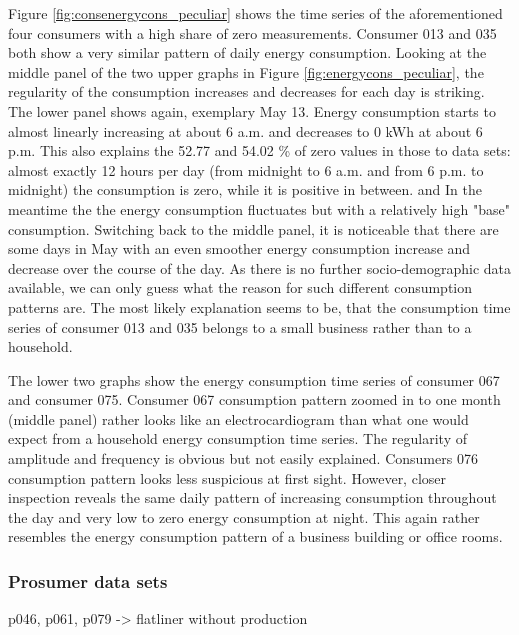 Figure \ref{fig:consenergycons_peculiar} shows the time series of the aforementioned four consumers with a high share of zero measurements. Consumer 013 and 035 both show a very similar pattern of daily energy consumption. Looking at the middle panel of the two upper graphs in Figure \ref{fig:energycons_peculiar}, the regularity of the consumption increases and decreases for each day is striking. The lower panel shows again, exemplary May 13. Energy consumption starts to almost linearly increasing at about 6 a.m. and decreases to 0 kWh at about 6 p.m. This also explains the 52.77 and 54.02 \% of zero values in those to data sets: almost exactly 12 hours per day (from midnight to 6 a.m. and from 6 p.m. to midnight) the consumption is zero, while it is positive in between. and  In the meantime the the energy consumption fluctuates but with a relatively high "base" consumption. Switching back to the middle panel, it is noticeable that there are some days in May with an even smoother energy consumption increase and decrease over the course of the day. As there is no further socio-demographic data available, we can only guess what the reason for such different consumption patterns are. The most likely explanation seems to be, that the consumption time series of consumer 013 and 035 belongs to a small business rather than to a household.

The lower two graphs show the energy consumption time series of consumer 067 and consumer 075. Consumer 067 consumption pattern zoomed in to one month (middle panel) rather looks like an electrocardiogram than what one would expect from a household energy consumption time series. The regularity of amplitude and frequency is obvious but not easily explained. Consumers 076 consumption pattern looks less suspicious at first sight. However, closer inspection reveals the same daily pattern of increasing consumption throughout the day and very low to zero energy consumption at night. This again rather resembles the energy consumption pattern of a business building or office rooms.



\subsubsection{Prosumer data sets}


p046, p061, p079 -> flatliner without production






